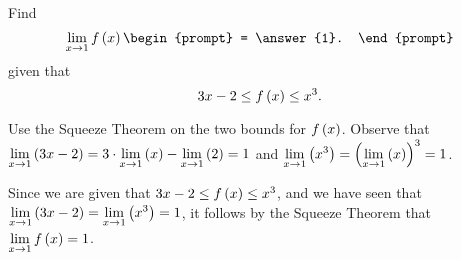 \documentclass{ximera}
\author{Gregory Hartman \and Matthew Carr}
\begin{document}
\begin{exercise}



Find 
\[
\lim_{x\to1}f\p{x}
\begin{prompt}
= \answer{1}.
\end{prompt}
\]
given that
\[
3x-2\le f\left(x\right)\le x^3.
\]
\begin{hint}
Use the Squeeze Theorem on the two bounds for $f\left(x\right)$. Observe that $\lim_{x\to1}\p{3x-2}=3\cdot\lim_{x\to1}\p{x}-\lim_{x\to1}\p{2}=1$ and $\lim_{x\to1}\p{x^3}=\p{\lim_{x\to1}\p{x}}^{3}=1$. 
\end{hint}
\begin{hint}
Since we are given that $3x-2\le f\left(x\right)\le x^3$, and we have seen that $\lim_{x\to1}\p{3x-2}=\lim_{x\to1}\p{x^3}=1$, it follows by the Squeeze Theorem that $\lim_{x\to1}f\p{x}=1$.
\end{hint}
\end{exercise}
\end{document}
